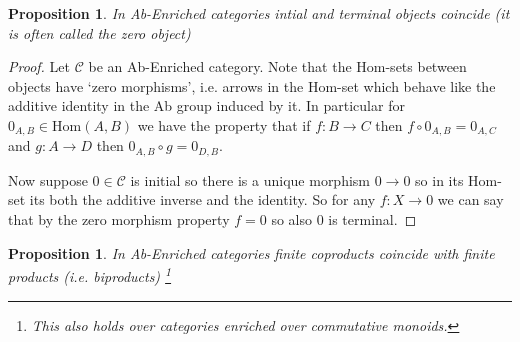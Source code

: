 \documentclass[12pt]{report}
\numberwithin{equation}{section}
\newcommand{\Hom}{{\mathrm{Hom}}}
\newtheorem{proposition}[dummy]{Proposition}
\begin{document}
	\begin{proposition}
		In Ab-Enriched categories intial and terminal objects coincide (it is often called the zero object)
	\end{proposition}
	\begin{proof}
		Let $\mathcal{C}$ be an Ab-Enriched category. Note that the Hom-sets between objects have `zero morphisms', i.e. arrows in the Hom-set which behave like the additive identity in the Ab group induced by it. In particular for $0_{A,B}\in \Hom(A,B)$ we have the property that if $f:B \to C$ then $f\circ 0_{A,B}=0_{A,C}$ and $g: A \to D$ then $0_{A,B}\circ g=0_{D,B}$.
		
		Now suppose $0 \in \mathcal{C}$ is initial so there is a unique morphism $0\to 0$ so in its Hom-set its both the additive inverse and the identity. So for any $f:X \to 0$ we can say that by the zero morphism property $f=0$ so also $0$ is terminal.
	\end{proof}
	\begin{proposition}
		In Ab-Enriched categories finite coproducts coincide with finite products (i.e. biproducts) \footnote{This also holds over categories enriched over commutative monoids.}
	\end{proposition}
\end{document}
